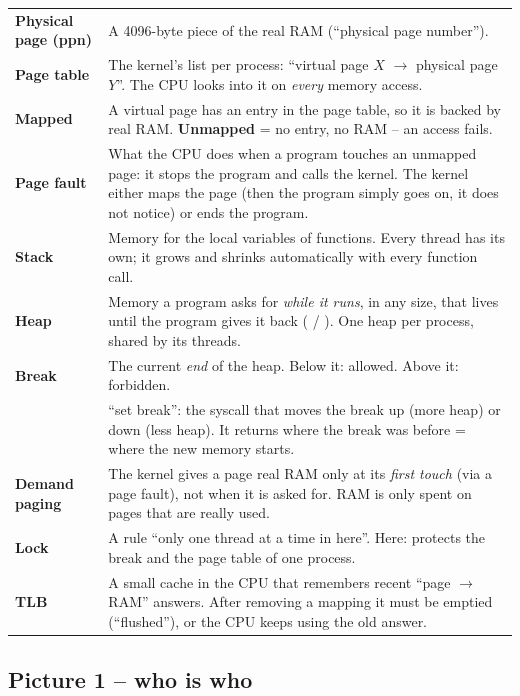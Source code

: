 \documentclass[11pt]{report}
\begin{document}
{\begin{longtable}{@{}L{3.1cm} L{12.3cm}@{}}
\textbf{Physical page (ppn)} & A 4096-byte piece of the real RAM (``physical page number'').\\
\textbf{Page table} & The kernel's list per process: ``virtual page $X$ $\to$ physical page $Y$''.
  The CPU looks into it on \emph{every} memory access.\\
\textbf{Mapped} & A virtual page has an entry in the page table, so it is backed by real RAM.
  \textbf{Unmapped} = no entry, no RAM -- an access fails.\\
\textbf{Page fault} & What the CPU does when a program touches an unmapped page: it stops the
  program and calls the kernel. The kernel either maps the page (then the program simply goes on,
  it does not notice) or ends the program.\\
\textbf{Stack} & Memory for the local variables of functions. Every thread has its own; it grows
  and shrinks automatically with every function call.\\
\textbf{Heap} & Memory a program asks for \emph{while it runs}, in any size, that lives until the
  program gives it back ( / ). One heap per process, shared by its threads.\\
\textbf{Break} & The current \emph{end} of the heap. Below it: allowed. Above it: forbidden.\\
\textbf{} & ``set break'': the syscall that moves the break up (more heap) or down (less
  heap). It returns where the break was before = where the new memory starts.\\
\textbf{Demand paging} & The kernel gives a page real RAM only at its \emph{first touch} (via a
  page fault), not when it is asked for. RAM is only spent on pages that are really used.\\
\textbf{Lock} & A rule ``only one thread at a time in here''. Here:  protects the
  break and the page table of one process.\\
\textbf{TLB} & A small cache in the CPU that remembers recent ``page $\to$ RAM'' answers. After
  removing a mapping it must be emptied (``flushed''), or the CPU keeps using the old answer.\\
\bottomrule
\end{longtable}
}

\subsection*{Picture 1 -- who is who}
\end{document}
